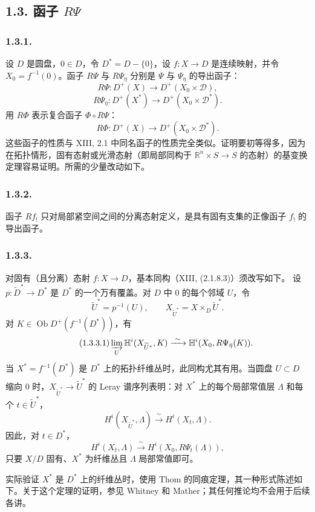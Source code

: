 \subsection*{1.3. 函子 $R\Psi$}

\subsubsection*{1.3.1.}
设 $D$ 是圆盘，$0\in D$，令 $D^*=D-\{0\}$，设 $f:X\longrightarrow D$ 是连续映射，并令 $X_0=f^{-1}(0)$。函子 $R\Psi$ 与 $R\Psi_\eta$ 分别是 $\Psi$ 与 $\Psi_\eta$ 的导出函子：
\[
R\Psi:D^+(X)\longrightarrow D^+(X_0\times\mathcal D),
\]
\[
R\Psi_\eta:D^+(X^*)\longrightarrow D^+(X_0\times\mathcal D^*).
\]
用 $R\Phi$ 表示复合函子 $\Phi\circ R\Psi$：
\[
R\Phi:D^+(X)\longrightarrow D^+(X_0\times\mathcal D^*).
\]
这些函子的性质与 XIII, 2.1 中同名函子的性质完全类似。证明要初等得多，因为在拓扑情形，固有态射或光滑态射（即局部同构于 $\mathbb R^n\times S\longrightarrow S$ 的态射）的基变换定理容易证明。所需的少量改动如下。

\subsubsection*{1.3.2.}
函子 $Rf_!$ 只对局部紧空间之间的分离态射定义，是具有固有支集的正像函子 $f_!$ 的导出函子。

\subsubsection*{1.3.3.}
对固有（且分离）态射 $f:X\longrightarrow D$，基本同构（XIII, (2.1.8.3)）须改写如下。
设 $p:\widetilde D^*\longrightarrow D^*$ 是 $D^*$ 的一个万有覆盖。对 $D$ 中 $0$ 的每个邻域 $U$，令
\[
\widetilde U^*=p^{-1}(U),
\qquad
X_{\widetilde U^*}=X\times_D\widetilde U^*.
\]
对 $K\in\operatorname{Ob}D^+(f^{-1}(D^*))$，有
\begin{equation}\tag{1.3.3.1}
\varinjlim_U\mathbb H^i(X_{\widetilde U^*},K)
\xrightarrow{\ \sim\ }
\mathbb H^i(X_0,R\Psi_{\bar\eta}(K)).
\end{equation}
当 $X^*=f^{-1}(D^*)$ 是 $D^*$ 上的拓扑纤维丛时，此同构尤其有用。当圆盘 $U\subset D$ 缩向 $0$ 时，$X_{\widetilde U^*}\longrightarrow\widetilde U^*$ 的 Leray 谱序列表明：对 $X^*$ 上的每个局部常值层 $\Lambda$ 和每个 $t\in\widetilde U^*$，
\[
H^i(X_{\widetilde U^*},\Lambda)
\xrightarrow{\ \sim\ }H^i(X_t,\Lambda).
\]
因此，对 $t\in D^*$，
\begin{equation}\tag{1.3.3.2}
H^i(X_t,\Lambda)
\xrightarrow{\ \sim\ }
H^i(X_0,R\Psi_t(\Lambda)),
\end{equation}
只要 $X/D$ 固有、$X^*$ 为纤维丛且 $\Lambda$ 局部常值即可。

实际验证 $X^*$ 是 $D^*$ 上的纤维丛时，使用 Thom 的同痕定理，其一种形式陈述如下。关于这个定理的证明，参见 Whitney 和 Mather；其任何推论均不会用于后续各讲。

